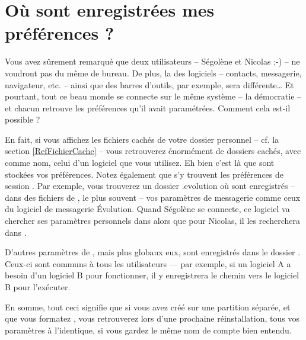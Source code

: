 \section{Où sont enregistrées mes préférences ?}
\label{RefEnrPref}
Vous avez sûrement remarqué que deux utilisateurs -- Ségolène et Nicolas ;-) -- ne voudront pas du même  de bureau. De plus, la  des logiciels -- contacts, messagerie, navigateur, etc. -- ainsi que des barres d'outils, par exemple, sera différente\ldots{} Et pourtant, tout ce beau monde se connecte sur le même système -- la démocratie -- et chacun retrouve les préférences qu'il avait paramétrées. Comment cela est-il possible ?\par
En fait, si vous affichez les fichiers cachés de votre dossier personnel -- cf. la section \ref{RefFichierCache} -- vous retrouverez énormément de dossiers cachés, avec comme nom, celui d'un logiciel que vous utilisez. Eh bien c'est là que sont stockées vos préférences. Notez également que s'y trouvent les préférences de session . Par exemple, vous trouverez un dossier .evolution où sont enregistrés -- dans des fichiers de , le plus souvent -- vos paramètres de messagerie comme ceux du logiciel de messagerie Évolution. Quand Ségolène se connecte, ce logiciel va chercher ses paramètres personnels dans  alors que pour Nicolas, il les recherchera dans .\par
D'autres paramètres de , mais plus globaux eux, sont enregistrés dans le dossier . Ceux-ci sont communs à tous les utilisateurs --- par exemple, si un logiciel A a besoin d'un logiciel B pour fonctionner, il y enregistrera le chemin vers le logiciel B pour l'exécuter.\par
En somme, tout ceci signifie que si vous avez créé  sur une partition séparée, et que vous formatez \Chemin{/}, vous retrouverez lors d'une prochaine réinstallation, tous vos paramètres à l'identique, si vous gardez le même nom de compte bien entendu.
